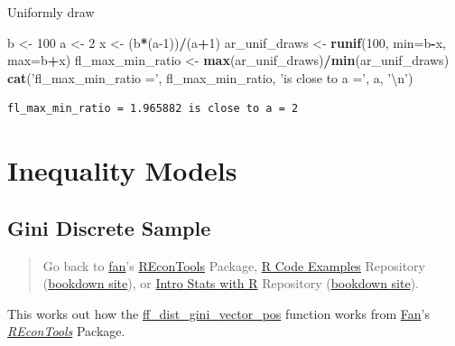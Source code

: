 \documentclass[
]{book}
\newenvironment{Shaded}{\begin{snugshade}}{\end{snugshade}}
\newcommand{\CharTok}[1]{\textcolor[rgb]{0.31,0.60,0.02}{#1}}
\newcommand{\DataTypeTok}[1]{\textcolor[rgb]{0.13,0.29,0.53}{#1}}
\newcommand{\DecValTok}[1]{\textcolor[rgb]{0.00,0.00,0.81}{#1}}
\newcommand{\KeywordTok}[1]{\textcolor[rgb]{0.13,0.29,0.53}{\textbf{#1}}}
\newcommand{\NormalTok}[1]{#1}
\newcommand{\OperatorTok}[1]{\textcolor[rgb]{0.81,0.36,0.00}{\textbf{#1}}}
\newcommand{\StringTok}[1]{\textcolor[rgb]{0.31,0.60,0.02}{#1}}
\begin{document}
Uniformly draw

\begin{Shaded}
\begin{Highlighting}[]
\NormalTok{b <-}\StringTok{ }\DecValTok{100}
\NormalTok{a <-}\StringTok{ }\DecValTok{2}
\NormalTok{x <-}\StringTok{ }\NormalTok{(b}\OperatorTok{*}\NormalTok{(a}\DecValTok{-1}\NormalTok{))}\OperatorTok{/}\NormalTok{(a}\OperatorTok{+}\DecValTok{1}\NormalTok{)}
\NormalTok{ar_unif_draws <-}\StringTok{ }\KeywordTok{runif}\NormalTok{(}\DecValTok{100}\NormalTok{, }\DataTypeTok{min=}\NormalTok{b}\OperatorTok{-}\NormalTok{x, }\DataTypeTok{max=}\NormalTok{b}\OperatorTok{+}\NormalTok{x)}
\NormalTok{fl_max_min_ratio <-}\StringTok{ }\KeywordTok{max}\NormalTok{(ar_unif_draws)}\OperatorTok{/}\KeywordTok{min}\NormalTok{(ar_unif_draws)}
\KeywordTok{cat}\NormalTok{(}\StringTok{'fl_max_min_ratio ='}\NormalTok{, fl_max_min_ratio, }\StringTok{'is close to a ='}\NormalTok{, a, }\StringTok{'}\CharTok{\textbackslash{}n}\StringTok{'}\NormalTok{)}
\end{Highlighting}
\end{Shaded}

\begin{verbatim}
fl_max_min_ratio = 1.965882 is close to a = 2 
\end{verbatim}

\hypertarget{inequality-models}{%
\section{Inequality Models}\label{inequality-models}}

\hypertarget{gini-discrete-sample}{%
\subsection{Gini Discrete Sample}\label{gini-discrete-sample}}

\begin{quote}
Go back to \href{http://fanwangecon.github.io/}{fan}'s \href{https://fanwangecon.github.io/REconTools/}{REconTools} Package, \href{https://fanwangecon.github.io/R4Econ/}{R Code Examples} Repository (\href{https://fanwangecon.github.io/R4Econ/bookdown}{bookdown site}), or \href{https://fanwangecon.github.io/Stat4Econ/}{Intro Stats with R} Repository (\href{https://fanwangecon.github.io/Stat4Econ/bookdown}{bookdown site}).
\end{quote}

This works out how the \href{https://fanwangecon.github.io/REconTools/reference/ff_dist_gini_vector_pos.html}{ff\_dist\_gini\_vector\_pos} function works from \href{https://fanwangecon.github.io/}{Fan}'s \emph{\href{https://fanwangecon.github.io/REconTools/}{REconTools}} Package.
\end{document}
